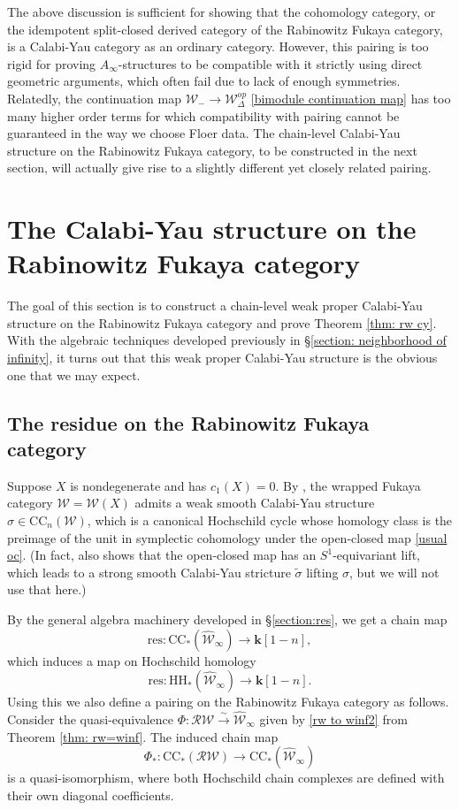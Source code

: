 \documentclass[11pt]{amsproc}
\def\K{{\mathbf{k}}}
\def\w{\mathcal{W}(E)}
\def\r#1{\mathrm{#1}}
\def\w{\mathcal{W}}
\def\rw{\mathcal{RW}}
\def\D{\Delta}
\def\ainf{A_\infty}
\def\winf{\widehat{\w}_{\infty}}
\theoremstyle{remark}
\numberwithin{equation}{section}
\begin{document}
The above discussion is sufficient for showing that the cohomology category, 
or the idempotent split-closed derived category of the Rabinowitz Fukaya category, 
is a Calabi-Yau category as an ordinary category.
However, this pairing is too rigid for proving $\ainf$-structures to be compatible with it strictly using direct geometric arguments,
which often fail due to lack of enough symmetries.
Relatedly, the continuation map $\w_{-} \to \w^{op}_{\D}$ \eqref{bimodule continuation map} has too many higher order terms for which compatibility with pairing cannot be guaranteed in the way we choose Floer data.
The chain-level Calabi-Yau structure on the Rabinowitz Fukaya category,
to be constructed in the next section,
 will actually give rise to a slightly different yet closely related pairing.

\section{The Calabi-Yau structure on the Rabinowitz Fukaya category}\label{section: residue on rw}

The goal of this section is to construct a chain-level weak proper Calabi-Yau structure on the Rabinowitz Fukaya category and prove Theorem \ref{thm: rw cy}.
With the algebraic techniques developed previously in \S\ref{section: neighborhood of infinity},
it turns out that this weak proper Calabi-Yau structure is the obvious one that we may expect.

\subsection{The residue on the Rabinowitz Fukaya category}

Suppose $X$ is nondegenerate and has $c_{1}(X) = 0$.
By \cite{ganatra}, the wrapped Fukaya category $\w = \w(X)$ admits a weak smooth Calabi-Yau structure $\sigma \in \r{CC}_{n}(\w)$,
which is a canonical Hochschild cycle whose homology class is the preimage of the unit in symplectic cohomology under the open-closed map \eqref{usual oc}.
(In fact, \cite{ganatra_cyclic} also shows that the open-closed map has an $S^{1}$-equivariant lift,
which leads to a strong smooth Calabi-Yau stricture $\tilde{\sigma}$ lifting $\sigma$,
but we will not use that here.)

By the general algebra machinery developed in \S\ref{section:res}, 
we get a chain map
\begin{equation}\label{winf res}
\r{res}: \r{CC}_{*}(\winf) \to \K[1-n],
\end{equation}
which induces a map on Hochschild homology
\begin{equation}
\r{res}: \r{HH}_{*}(\winf) \to \K[1-n].
\end{equation}
Using this we also define a pairing on the Rabinowitz Fukaya category as follows.
Consider the quasi-equivalence $\Phi: \rw \stackrel{\sim}\to \winf$ given by \eqref{rw to winf2} from Theorem \ref{thm: rw=winf}.
The induced chain map
\begin{equation}
\Phi_{*}: \r{CC}_{*}(\rw) \to \r{CC}_{*}(\winf)
\end{equation}
is a quasi-isomorphism,
where both Hochschild chain complexes are defined with their own diagonal coefficients.
\end{document}
